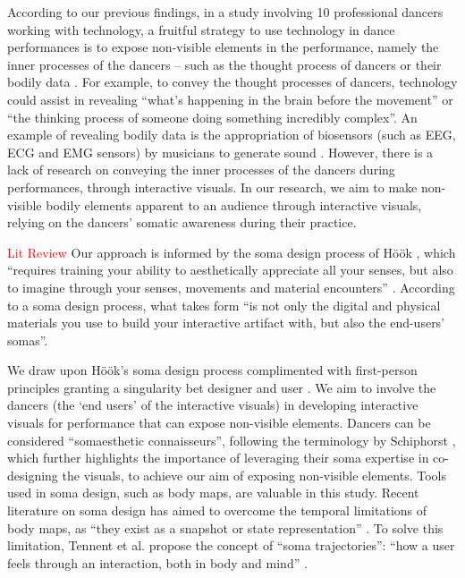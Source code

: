 According to our previous findings, in a study involving 10 professional dancers working with technology, a fruitful strategy to use technology in dance performances is to expose non-visible elements in the performance, namely the inner processes of the dancers – such as the thought process of dancers or their bodily data \cite{masu_how_2019}. For example, to convey the thought processes of dancers, technology could assist in revealing “what’s happening in the brain before the movement” or “the thinking process of someone doing something incredibly complex”. An example of revealing bodily data is the appropriation of biosensors (such as EEG, ECG and EMG sensors) by musicians to generate sound \cite{aly_appropriating_2021}. However, there is a lack of research on conveying the inner processes of the dancers during performances, through interactive visuals. In our research, we aim to make non-visible bodily elements apparent to an audience through interactive visuals, relying on the dancers’ somatic awareness during their practice.

\textcolor{red}{Lit Review}
Our approach is informed by the soma design process of Höök \cite{hook_designing_2018}, which “requires training your ability to aesthetically appreciate all your senses, but also to imagine through your senses, movements and material encounters” \cite{hook_soma_2019}. According to a soma design process, what takes form “is not only the digital and physical materials you use to build your interactive artifact with, but also the end-users’ somas”. 

We draw upon Höök's soma design process complimented with first-person principles granting a singularity bet designer and user \cite{hook_designing_2018}. We aim to involve the dancers (the ‘end users’ of the interactive visuals) in developing interactive visuals for performance that can expose non-visible elements. Dancers can be considered “somaesthetic connaisseurs”, following the terminology by Schiphorst \cite{schiphorst_self-evidence_2011}, which further highlights the importance of leveraging their soma expertise in co-designing the visuals, to achieve our aim of exposing non-visible elements. Tools used in soma design, such as body maps, are valuable in this study. Recent literature on soma design has aimed to overcome the temporal limitations of body maps, as “they exist as a snapshot or state representation” \cite{tennent_articulating_2021}. To solve this limitation, Tennent et al. propose the concept of “soma trajectories”: “how a user feels through an interaction, both in body and mind”  \cite{tennent_articulating_2021}.

